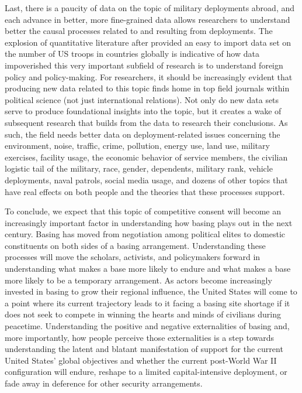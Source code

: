 Last, there is a paucity of data on the topic of military deployments abroad, and each advance in better, more fine-grained data allows researchers to understand better the causal processes related to and resulting from deployments. The explosion of quantitative literature after  provided an easy to import data set on the number of US troops in countries globally is indicative of how data impoverished this very important subfield of research is to understand foreign policy and policy-making. For researchers, it should be increasingly evident that producing new data related to this topic finds home in top field journals within political science (not just international relations). Not only do new data sets serve to produce foundational insights into the topic, but it creates a wake of subsequent research that builds from the data to research their conclusions. As such, the field needs better data on deployment-related issues concerning the environment, noise, traffic, crime, pollution, energy use, land use, military exercises, facility usage, the economic behavior of service members, the civilian logistic tail of the military, race, gender, dependents, military rank, vehicle deployments, naval patrols, social media usage, and dozens of other topics that have real effects on both people and the theories that these processes support. 

To conclude, we expect that this topic of competitive consent will become an increasingly important factor in understanding how basing plays out in the next century. Basing has moved from negotiation among political elites to domestic constituents on both sides of a basing arrangement. Understanding these processes will move the scholars, activists, and policymakers forward in understanding what makes a base more likely to endure and what makes a base more likely to be a temporary arrangement. As actors become increasingly invested in basing to grow their regional influence, the United States will come to a point where its current trajectory leads to it facing a basing site shortage if it does not seek to compete in winning the hearts and minds of civilians during peacetime. Understanding the positive and negative externalities of basing and, more importantly, how people perceive those externalities is a step towards understanding the latent and blatant manifestation of support for the current United States' global objectives and whether the current post-World War II configuration will endure, reshape to a limited capital-intensive deployment, or fade away in deference for other security arrangements.
